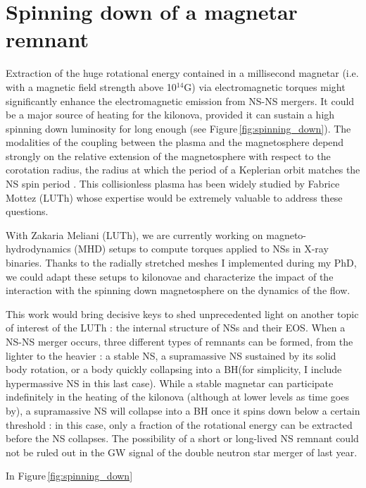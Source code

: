 \documentclass[12pt,onecolumn]{article}
\makeatletter
\newcommand{\gw}{GW\xspace}
\newcommand{\eos}{EOS\xspace}
\newcommand{\mhd}{MHD\xspace}
\newcommand*{\ns}{NS\@\xspace}
\newcommand*{\nss}{NSs\@\xspace}
\newcommand*{\bh}{BH\@\xspace}
\newcommand*{\eg}{e.g.\@\xspace}
\newcommand*{\ie}{i.e.\@\xspace}
\makeatother
\begin{document}
\section{Spinning down of a magnetar remnant}

Extraction of the huge rotational energy contained in a millisecond magnetar (\ie with a magnetic field strength above 10$^{14}$G) via electromagnetic torques might significantly enhance the electromagnetic emission from \ns-\ns mergers. It could be a major source of heating for the kilonova, provided it can sustain a high spinning down luminosity for long enough (see Figure\,\ref{fig:spinning_down}). The modalities of the coupling between the plasma and the magnetosphere depend strongly on the relative extension of the magnetosphere with respect to the corotation radius, the radius at which the period of a Keplerian orbit matches the \ns spin period \cite[see \eg the propeller effect described in][]{Bozzo2008}. This collisionless plasma has been widely studied by Fabrice Mottez (LUTh) whose expertise would be extremely valuable to address these questions. 

With Zakaria Meliani (LUTh), we are currently working on magneto-hydrodynamics (\mhd) setups to compute torques applied to \nss in X-ray binaries. Thanks to the radially stretched meshes I implemented during my PhD, we could adapt these setups to kilonovae and characterize the impact of the interaction with the spinning down magnetosphere on the dynamics of the flow. 

This work would bring decisive keys to shed unprecedented light on another topic of interest of the LUTh : the internal structure of \nss and their \eos. When a \ns-\ns merger occurs, three different types of remnants can be formed, from the lighter to the heavier : a stable \ns, a supramassive \ns sustained by its solid body rotation, or a body quickly collapsing into a \bh (for simplicity, I include hypermassive \ns in this last case). While a stable magnetar can participate indefinitely in the heating of the kilonova (although at lower levels as time goes by), a supramassive \ns will collapse into a \bh once it spins down below a certain threshold : in this case, only a fraction of the rotational energy can be extracted before the \ns collapses. The possibility of a short or long-lived \ns remnant could not be ruled out in the \gw signal of the double neutron star merger of last year.

In Figure\,\ref{fig:spinning_down}
\end{document}
